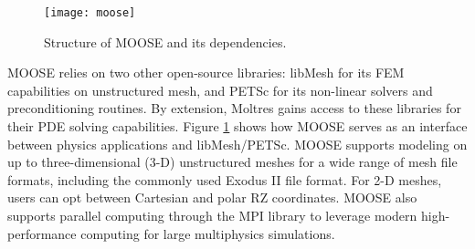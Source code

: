 \begin{figure}[htb!]
	\centering
	\texttt{[image: moose]}
	\caption{Structure of MOOSE and its dependencies.}
	\label{fig:moose}
\end{figure}

MOOSE relies on two other open-source libraries: libMesh
\cite{kirk_libmesh_2006} for its \gls{FEM} capabilities on
unstructured mesh, and PETSc \cite{satish_petsc_2019} for its non-linear
solvers and preconditioning routines. By extension, Moltres gains access to
these libraries for their \gls{PDE} solving capabilities. Figure
\ref{fig:moose} shows how MOOSE serves as an interface between physics
applications and libMesh/PETSc. MOOSE supports
modeling on up to three-dimensional (3-D) unstructured meshes for a wide range
of mesh file formats, including the commonly used Exodus II file format. For
2-D meshes, users can opt between Cartesian and polar RZ coordinates. MOOSE
also supports parallel computing through the \gls{MPI} library to leverage
modern high-performance computing for large multiphysics simulations.

